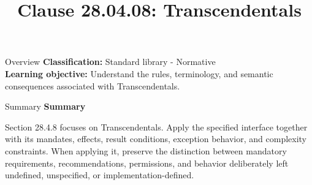 \documentclass[10pt,letterpaper]{article}
\title{Clause 28.04.08: Transcendentals}
\author{}
\date{}
\begin{document}
\maketitle
\begin{CornellOverviewBox}{Overview}
\textbf{Classification:} Standard library - Normative\\[2pt]
\textbf{Learning objective:} Understand the rules, terminology, and semantic consequences associated with Transcendentals.
\end{CornellOverviewBox}\begin{CornellSummaryBox}{Summary}
{\sffamily\bfseries\color{Accent} Summary}\par\vspace{3pt}Section 28.4.8 focuses on Transcendentals. Apply the specified interface together with its mandates, effects, result conditions, exception behavior, and complexity constraints. When applying it, preserve the distinction between mandatory requirements, recommendations, permissions, and behavior deliberately left undefined, unspecified, or implementation-defined.
\end{CornellSummaryBox}
\end{document}
